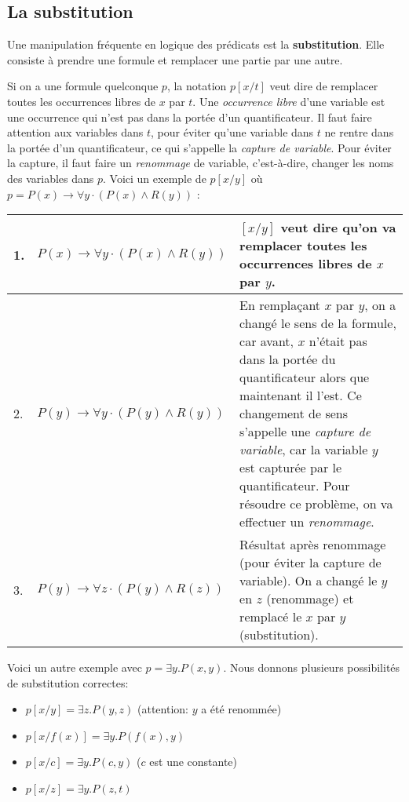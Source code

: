 \subsection{La substitution}
Une manipulation fréquente en logique des prédicats est la \textbf{substitution}. Elle consiste à prendre une formule et remplacer une partie par une autre.

Si on a une formule quelconque $p$, la notation $p[x/t]$ veut dire de remplacer toutes les occurrences libres de $x$ par $t$.
Une {\em occurrence libre} d'une variable est une occurrence qui n'est pas dans la portée d'un quantificateur.
Il faut faire attention aux variables dans $t$, pour éviter qu'une variable dans $t$ ne rentre dans la portée d'un quantificateur,
ce qui s'appelle la {\em capture de variable}.
Pour éviter la capture, il faut faire un {\em renommage} de variable, c'est-à-dire, changer les noms des variables dans $p$.
Voici un exemple de $p[x/y]$ où $p = P(x) \rightarrow \forall y \cdot (P(x) \wedge R(y))$ :
\begin{center}
\begin{tabular}{|l |l |>{\raggedright}m{6cm}|}
\hline
1. &$P(x) \rightarrow \forall y \cdot (P(x) \wedge R(y))$&$[x/y]$ veut dire qu'on va remplacer toutes les occurrences libres de $x$ par $y$.\tabularnewline
\hline
2. &$P(y) \rightarrow \forall y \cdot (P(y) \wedge R(y))$&En remplaçant $x$ par $y$, on a changé le sens de la formule, car avant, $x$ n'était pas dans la portée du quantificateur alors que maintenant il l'est. Ce changement de sens s'appelle une \textit{capture de variable}, car la variable $y$ est capturée par le quantificateur. Pour résoudre ce problème, on va effectuer un \textit{renommage}.\tabularnewline
\hline
3. &$P(y) \rightarrow \forall z \cdot (P(y) \wedge R(z))$&Résultat après renommage (pour éviter la capture de variable).
On a changé le $y$ en $z$ (renommage) et remplacé le $x$ par $y$ (substitution). \tabularnewline
\hline
\end{tabular}
\end{center}

Voici un autre exemple avec $p = \exists y . P(x,y)$.
Nous donnons plusieurs possibilités de substitution correctes:
\begin{itemize}
\item $p[x/y] = \exists z. P(y,z)$ (attention: $y$ a été renommée)
\item $p[x/f(x)] = \exists y. P(f(x),y)$
\item $p[x/c] = \exists y. P(c,y)$ ($c$ est une constante)
\item $p[x/z] = \exists y. P(z,t)$
\end{itemize}

